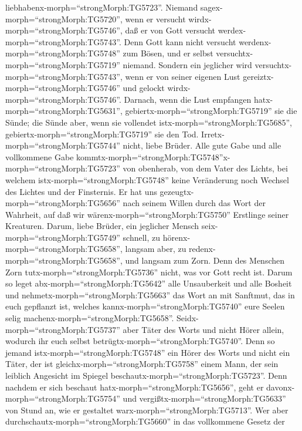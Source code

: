 liebhabenx-morph=``strongMorph:TG5723''.  Niemand
sagex-morph=``strongMorph:TG5720'', wenn er versucht
wirdx-morph=``strongMorph:TG5746'', daß er von Gott versucht
werdex-morph=``strongMorph:TG5743''. Denn Gott kann nicht versucht
werdenx-morph=``strongMorph:TG5748'' zum Bösen, und er selbst
versuchtx-morph=``strongMorph:TG5719'' niemand.  Sondern
ein jeglicher wird versuchtx-morph=``strongMorph:TG5743'', wenn er von
seiner eigenen Lust gereiztx-morph=``strongMorph:TG5746'' und gelockt
wirdx-morph=``strongMorph:TG5746''.  Darnach, wenn die Lust
empfangen hatx-morph=``strongMorph:TG5631'',
gebiertx-morph=``strongMorph:TG5719'' sie die Sünde; die Sünde aber,
wenn sie vollendet istx-morph=``strongMorph:TG5685'',
gebiertx-morph=``strongMorph:TG5719'' sie den Tod. 
Irretx-morph=``strongMorph:TG5744'' nicht, liebe Brüder. 
Alle gute Gabe und alle vollkommene Gabe
kommtx-morph=``strongMorph:TG5748''x-morph=``strongMorph:TG5723'' von
obenherab, von dem Vater des Lichts, bei welchem
istx-morph=``strongMorph:TG5748'' keine Veränderung noch Wechsel des
Lichtes und der Finsternis.  Er hat uns
gezeugtx-morph=``strongMorph:TG5656'' nach seinem Willen durch das Wort
der Wahrheit, auf daß wir wärenx-morph=``strongMorph:TG5750'' Erstlinge
seiner Kreaturen.  Darum, liebe Brüder, ein jeglicher
Mensch seix-morph=``strongMorph:TG5749'' schnell, zu
hörenx-morph=``strongMorph:TG5658'', langsam aber, zu
redenx-morph=``strongMorph:TG5658'', und langsam zum Zorn. 
Denn des Menschen Zorn tutx-morph=``strongMorph:TG5736'' nicht, was vor
Gott recht ist.  Darum so leget
abx-morph=``strongMorph:TG5642'' alle Unsauberkeit und alle Bosheit und
nehmetx-morph=``strongMorph:TG5663'' das Wort an mit Sanftmut, das in
euch gepflanzt ist, welches kannx-morph=``strongMorph:TG5740'' eure
Seelen selig machenx-morph=``strongMorph:TG5658''. 
Seidx-morph=``strongMorph:TG5737'' aber Täter des Worts und nicht Hörer
allein, wodurch ihr euch selbst betrügtx-morph=``strongMorph:TG5740''.
 Denn so jemand istx-morph=``strongMorph:TG5748'' ein Hörer
des Worts und nicht ein Täter, der ist
gleichx-morph=``strongMorph:TG5758'' einem Mann, der sein leiblich
Angesicht im Spiegel beschautx-morph=``strongMorph:TG5723''.
 Denn nachdem er sich beschaut
hatx-morph=``strongMorph:TG5656'', geht er
davonx-morph=``strongMorph:TG5754'' und
vergißtx-morph=``strongMorph:TG5633'' von Stund an, wie er gestaltet
warx-morph=``strongMorph:TG5713''.  Wer aber
durchschautx-morph=``strongMorph:TG5660'' in das vollkommene Gesetz der

